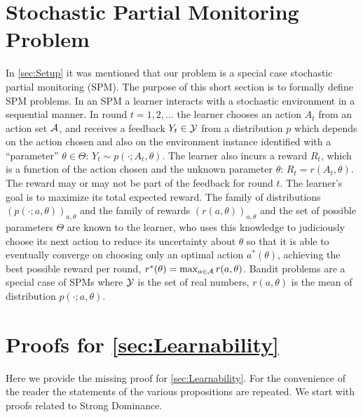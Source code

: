 \clearpage
\onecolumn
\appendix

\section{Stochastic Partial Monitoring Problem}
\label{sec:spm}
In \cref{sec:Setup} it was mentioned that our problem is a special case stochastic partial monitoring (SPM).
The purpose of this short section is to formally define SPM problems.
In an SPM a learner interacts with a stochastic environment in a sequential manner.
In round $t=1,2,\dots$ the learner chooses an action $A_t$ from an action set $\mathcal{A}$, and receives a feedback $Y_t\in \mathcal{Y}$
from a distribution $p$ which depends on the action chosen and also on the environment instance identified
with a ``parameter'' $\theta\in\Theta$:
$Y_t \sim p(\cdot;A_t,\theta)$. 
The learner also incurs a reward $R_t$, which is a function of the action chosen and the unknown parameter $\theta$:
$R_t = r(A_t,\theta)$. 
The reward may or may not be part of the feedback for round $t$.
The learner's goal is to maximize its total expected reward.
The family of distributions $(p(\cdot;a,\theta))_{a,\theta}$ and the family of rewards $(r(a,\theta))_{a,\theta}$
and the set of possible parameters $\Theta$ are known to the learner, who uses this knowledge to judiciously choose
its next action to reduce its uncertainty about $\theta$ so that it is able to eventually converge on choosing only an 
optimal action $a^*(\theta)$, achieving the best possible reward per round, $r^*(\theta) = \max_{a\in \mathcal{A}} r(a,\theta)$.  Bandit problems are a special case of SPMs where $\mathcal{Y}$ is the set of real numbers, $r(a,\theta)$ is the mean of distribution $p(\cdot;a,\theta)$.

\section{Proofs for \cref{sec:Learnability}}

\label{sec:apxlearnability}
Here we provide the missing proof for \cref{sec:Learnability}.
For the convenience of the reader the statements of the various propositions are repeated.
We start with proofs related to Strong Dominance.
